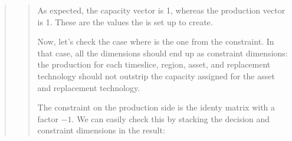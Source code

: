 \documentclass[letterpaper,10pt,english]{sphinxmanual}
\begin{document}
\begin{fulllineitems}
\begin{quote}
\begin{quote}
As expected, the capacity vector is 1, whereas the production vector is \sphinxhyphen{}1.
These are the values the  is set up
to create.

Now, let’s check the case where  is the one from the
 constraint. In that case, all the
dimensions should end up as constraint dimensions: the production for each
timeslice, region, asset, and replacement technology should not outstrip the
capacity assigned for the asset and replacement technology.

\begin{sphinxVerbatim}[commandchars=\\\{\}]
  
      
      
  
        
   
\end{sphinxVerbatim}

The  constraint on the production
side is the identy matrix with a factor \(-1\). We can easily check this
by stacking the decision and constraint dimensions in the result:


\end{quote}
\end{quote}
\end{fulllineitems}
\end{document}
